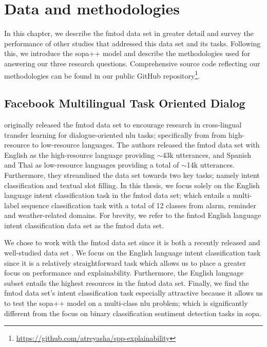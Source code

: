 \chapter{Data and methodologies}

\label{chapter:methodologies}

In this chapter, we describe the \ac{fmtod} data set in greater detail and
survey the performance of other studies that addressed this data set and its
tasks. Following this, we introduce the \ac{sopa}++ model and describe the
methodologies used for answering our three research questions. Comprehensive
source code reflecting our methodologies can be found in our public GitHub
repository\footnote{\url{https://github.com/atreyasha/spp-explainability}}.

\section{Facebook Multilingual Task Oriented Dialog}

\citet{schuster-etal-2019-cross-lingual} originally released the \ac{fmtod} data
set to encourage research in cross-lingual transfer learning for
dialogue-oriented \ac{nlu} tasks; specifically from
from high-resource to low-resource languages. The authors released the \ac{fmtod}
data set with English as the high-resource language providing $\sim$43k
utterances, and Spanish and Thai as low-resource languages providing a total of
$\sim$14k utterances. Furthermore, they streamlined the data set towards two key
tasks; namely intent classification and textual slot filling. In this thesis, we
focus solely on the English language intent classification task in the \ac{fmtod}
data set; which entails a multi-label sequence classification task with a total
of 12 classes from alarm, reminder and weather-related domains. For brevity, we
refer to the \ac{fmtod} English language intent classification data set as the \ac{fmtod}
data set.

We chose to work with the \ac{fmtod} data set since it is both a recently released
and well-studied data set
\citep{schuster-etal-2019-cross-lingual,zhang2019joint,zhang-etal-2020-intent}.
We focus on the English language intent classification task since it is a
relatively straightforward task which allows us to place a greater focus on
performance and explainability. Furthermore, the English language subset entails
the highest resources in the \ac{fmtod} data set. Finally, we find the \ac{fmtod} data
set's intent classification task especially attractive because it allows us
to test the \ac{sopa}++ model on a multi-class \ac{nlu} problem; which is significantly
different from the focus on binary classification sentiment detection tasks in
\ac{sopa}. 

